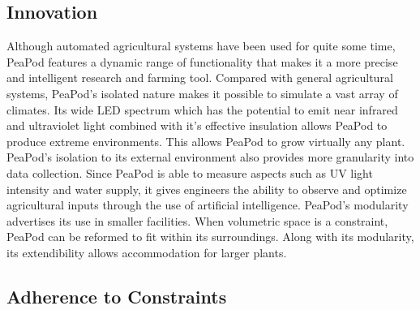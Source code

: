 \documentclass{report}
\begin{document}
\subsection{Innovation}
\label{sec:innovation}





Although automated agricultural systems have been used for quite some time, PeaPod features a dynamic range of functionality that makes it a more precise and intelligent research and farming tool. Compared with general agricultural systems, PeaPod’s isolated nature makes it possible to simulate a vast array of climates. Its wide LED spectrum which has the potential to emit near infrared and ultraviolet light combined with it’s effective insulation allows PeaPod to produce extreme environments. This allows PeaPod to grow virtually any plant. PeaPod’s isolation to its external environment also provides more granularity into data collection. Since PeaPod is able to measure aspects such as UV light intensity and water supply, it gives engineers the ability to observe and optimize agricultural inputs through the use of artificial intelligence. PeaPod’s modularity advertises its use in smaller facilities. When volumetric space is a constraint, PeaPod can be reformed to fit within its surroundings. Along with its modularity, its extendibility allows accommodation for larger plants. 

\subsection{Adherence to Constraints}
\label{sec:constraints}
\end{document}
